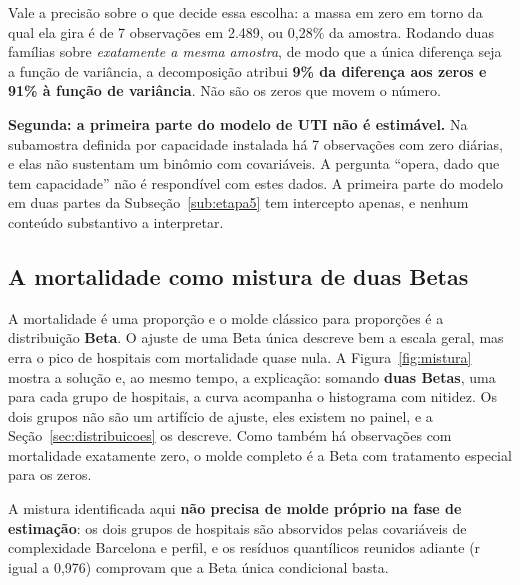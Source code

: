 Vale a precisão sobre o que decide essa escolha: a massa em zero em torno
da qual ela gira é de 7 observações em 2.489, ou 0,28\% da amostra. Rodando
duas famílias sobre \emph{exatamente a mesma amostra}, de modo que a única
diferença seja a função de variância, a decomposição atribui \textbf{9\% da
diferença aos zeros e 91\% à função de variância}. Não são os zeros que
movem o número.

\textbf{Segunda: a primeira parte do modelo de UTI não é estimável.} Na
subamostra definida por capacidade instalada há 7 observações com zero
diárias, e elas não sustentam um binômio com covariáveis. A pergunta
``opera, dado que tem capacidade'' não é respondível com estes dados. A
primeira parte do modelo em duas partes da Subseção~\ref{sub:etapa5} tem
intercepto apenas, e nenhum conteúdo substantivo a interpretar.

\subsection*{A mortalidade como mistura de duas Betas}

A mortalidade é uma proporção e o molde clássico para proporções é a
distribuição \textbf{Beta}. O ajuste de uma Beta única descreve bem a
escala geral, mas erra o pico de hospitais com mortalidade quase nula.
A Figura~\ref{fig:mistura} mostra a solução e, ao mesmo tempo, a
explicação: somando \textbf{duas Betas}, uma para cada grupo de
hospitais, a curva acompanha o histograma com nitidez. Os dois grupos
não são um artifício de ajuste, eles existem no painel, e a
Seção~\ref{sec:distribuicoes} os descreve. Como também há observações
com mortalidade exatamente zero, o molde completo é a Beta com
tratamento especial para os zeros.

A mistura identificada aqui \textbf{não precisa de molde próprio na fase
de estimação}: os dois grupos de hospitais são absorvidos pelas
covariáveis de complexidade Barcelona e perfil, e os resíduos
quantílicos reunidos adiante (r igual a 0,976) comprovam que a Beta
única condicional basta.


